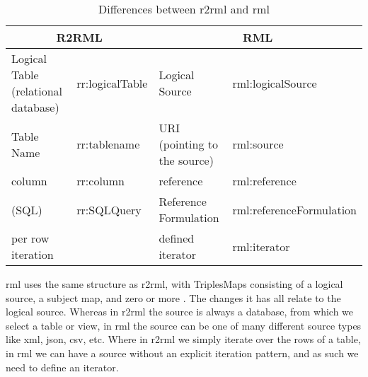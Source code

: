\begin{table}[]
    \begin{tabular}{|ll|ll|}
    \hline
    \multicolumn{2}{|c|}{R2RML}                           & \multicolumn{2}{c|}{RML}                                            \\ \hline
    Logical Table (relational database) & rr:logicalTable & Logical Source                           & rml:logicalSource        \\ \hline
    Table Name                          & rr:tablename    & URI (pointing to the source)             & rml:source               \\ \hline
    column                              & rr:column       & reference                                & rml:reference            \\ \hline
    (SQL)                               & rr:SQLQuery     & Reference Formulation                    & rml:referenceFormulation \\ \hline
    per row iteration                   &                 & defined iterator                         & rml:iterator             \\ \hline
    \end{tabular}
    \caption{Differences between \acrshort{r2rml} and \acrshort{rml}}
    \label{tab:r2rml_rml_differences}
\end{table}

\acrshort{rml} uses the same structure as \acrshort{r2rml}, with TriplesMaps consisting of a logical source, a subject map, and zero or more . The changes it has all relate to the logical source. Whereas in \acrshort{r2rml} the source is always a database, from which we select a table or view, in \acrshort{rml} the source can be one of many different source types like \acrshort{xml}, \acrshort{json}, \acrshort{csv}, etc. Where in \acrshort{r2rml} we simply iterate over the rows of a table, in \acrshort{rml} we can have a source without an explicit iteration pattern, and as such we need to define an iterator. 

